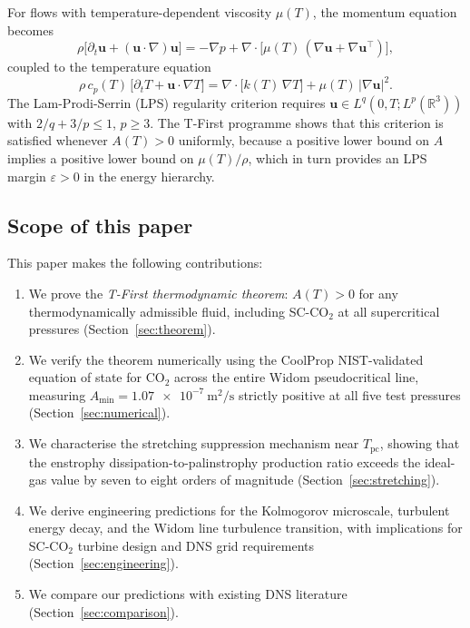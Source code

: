 \documentclass[12pt,a4paper]{article}
\newcommand{\R}{\mathbb{R}}
\newcommand{\muT}{\mu(T)}           %
\newcommand{\eps}{\varepsilon}
\newcommand{\Tc}{T_{\mathrm{pc}}}   %
\newcommand{\Amin}{A_{\min}}
\newcommand{\sco}{SC-CO$_2$}
\begin{document}
For flows with temperature-dependent viscosity $\muT$, the momentum equation becomes
\begin{equation}
  \rho\bigl[\partial_t \bm{u} + (\bm{u}\cdot\nabla)\bm{u}\bigr]
  = -\nabla p + \nabla\cdot\bigl[\muT\,(\nabla\bm{u} + \nabla\bm{u}^\top)\bigr],
  \label{eq:NS_muT}
\end{equation}
coupled to the temperature equation
\begin{equation}
  \rho\,c_p(T)\,\bigl[\partial_t T + \bm{u}\cdot\nabla T\bigr]
  = \nabla\cdot\bigl[k(T)\,\nabla T\bigr] + \muT\,|\nabla\bm{u}|^2.
  \label{eq:T_eq}
\end{equation}
The Lam-Prodi-Serrin (LPS) regularity criterion \citep{Prodi1959,Serrin1963}
requires $\bm{u} \in L^q(0,T;L^p(\R^3))$ with $2/q + 3/p \leq 1$, $p \geq 3$.
The T-First programme shows that this criterion is satisfied whenever $A(T) > 0$
uniformly, because a positive lower bound on $A$ implies a positive lower bound on
$\muT/\rho$, which in turn provides an LPS margin $\eps > 0$ in the energy hierarchy.

\subsection{Scope of this paper}
\label{sec:intro:scope}

This paper makes the following contributions:
\begin{enumerate}[label=(\arabic*)]
  \item We prove the \emph{T-First thermodynamic theorem}: $A(T) > 0$ for any
    thermodynamically admissible fluid, including \sco{} at all supercritical
    pressures (Section~\ref{sec:theorem}).
  \item We verify the theorem numerically using the CoolProp NIST-validated equation
    of state \citep{Bell2014} for CO$_2$ across the entire Widom pseudocritical line,
    measuring $\Amin = \SI{1.07e-7}{\metre\squared\per\second}$ strictly positive at
    all five test pressures (Section~\ref{sec:numerical}).
  \item We characterise the stretching suppression mechanism near $\Tc$, showing that
    the enstrophy dissipation-to-palinstrophy production ratio exceeds the ideal-gas
    value by seven to eight orders of magnitude (Section~\ref{sec:stretching}).
  \item We derive engineering predictions for the Kolmogorov microscale, turbulent
    energy decay, and the Widom line turbulence transition, with implications for
    \sco{} turbine design and DNS grid requirements (Section~\ref{sec:engineering}).
  \item We compare our predictions with existing DNS literature
    (Section~\ref{sec:comparison}).
\end{enumerate}
\end{document}
